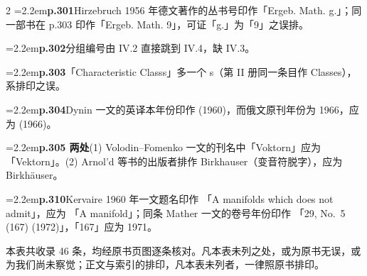 \begin{multicols}{2}
\noindent\hangindent=2.2em\textbf{p.301}\quad Hirzebruch 1956 年德文著作的丛书号印作「Ergeb. Math. g.」；同一部书在 p.303 印作「Ergeb. Math. 9」，可证「g.」为「9」之误排。\par

\noindent\hangindent=2.2em\textbf{p.302}\quad 分组编号由 IV.2 直接跳到 IV.4，缺 IV.3。\par

\noindent\hangindent=2.2em\textbf{p.303}\quad 「Characteristic Classs」多一个 s（第 II 册同一条目作 Classes），系排印之误。\par

\noindent\hangindent=2.2em\textbf{p.304}\quad Dynin 一文的英译本年份印作 (1960)，而俄文原刊年份为 1966，应为 (1966)。\par

\noindent\hangindent=2.2em\textbf{p.305 两处}\quad (1) Volodin--Fomenko 一文的刊名中「Voktorn」应为「Vektorn」。(2) Arnol'd 等书的出版者排作 Birkhauser（变音符脱字），应为 Birkhäuser。\par

\noindent\hangindent=2.2em\textbf{p.310}\quad Kervaire 1960 年一文题名印作 「A manifolds which does not admit」，应为 「A manifold」；同条 Mather 一文的卷号年份印作 「29, No.\ 5 (167) (1972)」，「167」应为 1971。\par

\end{multicols}

\noindent 本表共收录 46 条，均经原书页图逐条核对。凡本表未列之处，或为原书无误，或为我们尚未察觉；正文与索引的排印，凡本表未列者，一律照原书排印。
\normalsize

